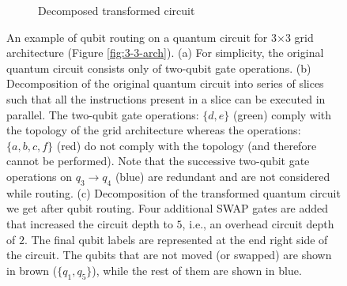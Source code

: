 \begin{figure}
\begin{subfigure}[b]{0.35\linewidth}
        \caption{Decomposed transformed circuit\label{fig:transformed_circ}}
    \end{subfigure}
    \hfill
    \caption[Topologies of Quantum Computing hardware qRoute is tested on]{An example of qubit routing on a quantum circuit for 3$\times$3 grid architecture (Figure \ref{fig:3-3-arch}). (a) For simplicity, the original quantum circuit consists only of two-qubit gate operations. (b) Decomposition of the original quantum circuit into series of slices such that all the instructions present in a slice can be executed in parallel. The two-qubit gate operations: $\{d,e\}$ (green) comply with the topology of the grid architecture whereas the operations: $\{a, b, c, f\}$ (red) do not comply with the topology (and therefore cannot be performed). Note that the successive two-qubit gate operations on $q_3\rightarrow q_4$ (blue) are redundant and are not considered while routing. (c) Decomposition of the transformed quantum circuit we get after qubit routing. Four additional SWAP gates are added that increased the circuit depth to $5$, i.e., an overhead circuit depth of $2$. The final qubit labels are represented at the end right side of the circuit. The qubits that are not moved (or swapped) are shown in brown ($\{q_1, q_5\}$), while the rest of them are shown in blue.}
    \label{fig:routing-example}
\end{figure}

